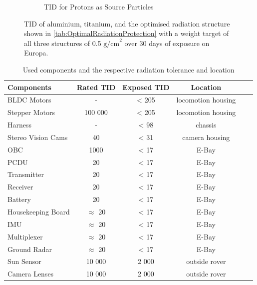 \begin{figure}[htb]
\begin{subfigure}[b]{0.49\textwidth}
         \caption{TID for Protons as Source Particles}
         \label{fig:TIDProtonShielding}
     \end{subfigure}
     \caption{TID of aluminium, titanium, and the optimised radiation structure shown in \autoref{tab:OptimalRadiationProtection} with a weight target of all three structures of 0.5 \(\text{g/cm}^2\) over 30 days of exposure on Europa.}
     \label{fig:AluminiumTitanOptimised}
\end{figure}

\begin{table}[htb]
\centering
\caption{Used components and the respective radiation tolerance and location}
\begin{adjustbox}{max width=\textwidth}
\begin{tabular}[l]{lccccc}

	\toprule
		Components	&	Rated TID	&	Exposed TID	&	Location\\
	\midrule
	
	BLDC Motors	&	-	&	< 205	&	locomotion housing\\	
	
	Stepper Motors	&	100 000	&	< 205	&	locomotion housing\\
	
	Harness	&	-	&	< 98	&	chassis\\	
	
	Stereo Vision Cams	&	40	&	< 31	&	camera housing\\	
	
	OBC	&	1000	&	< 17	&	E-Bay\\
	
	PCDU	&	20	&	< 17	&	E-Bay\\
	
	Transmitter	&	20	&	< 17	&	E-Bay\\
	
	Receiver	&	20	&	< 17	&	E-Bay\\
	
	Battery	&	20	&	< 17	&	E-Bay\\
	
	Housekeeping Board	&	\(\approx\) 20	&	< 17	&	E-Bay\\
	
	IMU	&	\(\approx\) 20	&	< 17	&	E-Bay\\
	
	Multiplexer	&	\(\approx\) 20	&	< 17	&	E-Bay\\
	
	Ground Radar	&	\(\approx\) 20	&	< 17	&	E-Bay\\
	
	Sun Sensor	&	10 000	&	2 000	&	outside rover\\
	
	Camera Lenses	&	10 000	&	2 000	&	outside rover\\

	\bottomrule

\end{tabular}
\end{adjustbox}
\label{tab:RadiationList}
\end{table}

